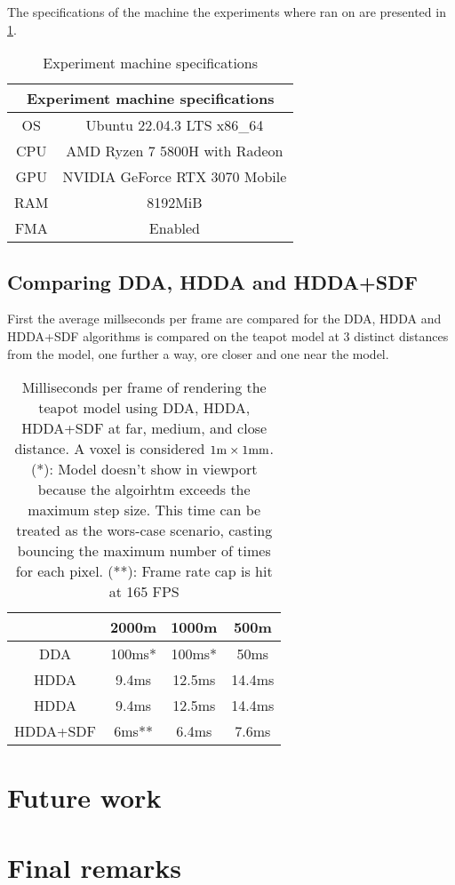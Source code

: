The specifications of the machine the experiments where ran on are presented in \cref{specs}.
\begin{table}[h]
  \centering
\begin{tabular}{|c||c|}
  \hline
  \multicolumn{2}{|c|}{Experiment machine specifications} \\
  \hline
  OS & Ubuntu 22.04.3 LTS x86\_64\\
  \hline
  CPU & AMD Ryzen 7 5800H with Radeon\\
  \hline
  GPU &  NVIDIA GeForce RTX 3070 Mobile\\
  \hline
  RAM & 8192MiB \\
  \hline
  FMA & Enabled \\
  \hline
\end{tabular}
  \caption{Experiment machine specifications}
  \label{specs}
\end{table}

\subsection{Comparing DDA, HDDA and HDDA+SDF}

First the average millseconds per frame are compared for the DDA, HDDA and HDDA+SDF algorithms is compared on the teapot model at 3 distinct distances from the model, one further a way, ore closer and one near the model.

\begin{table}[h]
  \centering
  \begin{tabular}{|c||c|c|c|}
    \hline
    & 2000m & 1000m & 500m \\
    \hline
    DDA & 100ms* & 100ms* & 50ms \\
    \hline
    HDDA & 9.4ms & 12.5ms & 14.4ms \\
    \hline
    HDDA & 9.4ms & 12.5ms & 14.4ms \\
    \hline
    HDDA+SDF & 6ms** & 6.4ms & 7.6ms\\
    \hline
  \end{tabular}
  \caption{Milliseconds per frame of rendering the teapot model using DDA, HDDA, HDDA+SDF at far, medium, and close distance. A voxel is considered $1\rm{m}\times1\rm{m}\time1\rm{m}$. (*): Model doesn't show in viewport because the algoirhtm exceeds the maximum step size. This time can be treated as the wors-case scenario, casting bouncing the maximum number of times for each pixel. (**): Frame rate cap is hit at 165 FPS}
\end{table}

\section{Future work}
\section{Final remarks}
